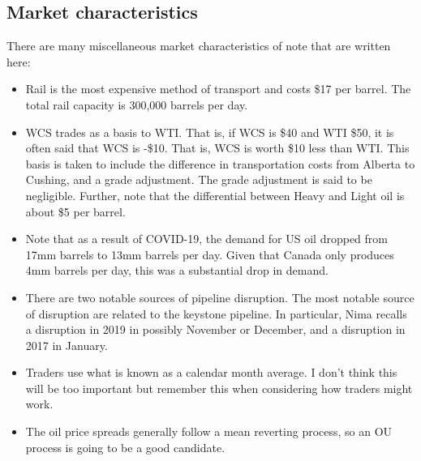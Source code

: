 \documentclass[11pt, letterpaper,nounbold]{article}
\begin{document}
\subsection{Market characteristics}
There are many miscellaneous market characteristics of note that are written here:
\begin{itemize}
	\item{Rail is the most expensive method of transport and costs \$17 per barrel. The total rail capacity is 300,000 barrels per day.}
	\item{WCS trades as a basis to WTI. That is, if WCS is \$40 and WTI \$50, it is often said that WCS is -\$10. That is, WCS is worth \$10 less than WTI. This basis is taken to include the difference in transportation costs from Alberta to Cushing, and a grade adjustment. The grade adjustment is said to be negligible. Further, note that the differential between Heavy and Light oil is about \$5 per barrel.}
	\item{Note that as a result of COVID-19, the demand for US oil dropped from 17mm barrels to 13mm barrels per day. Given that Canada only produces 4mm barrels per day, this was a substantial drop in demand.}
	\item{There are two notable sources of pipeline disruption. The most notable source of disruption are related to the keystone pipeline. In particular, Nima recalls a disruption in 2019 in possibly November or December, and a disruption in 2017 in January.}
	\item{Traders use what is known as a calendar month average. I don't think this will be too important but remember this when considering how traders might work.}
	\item{The oil price spreads generally follow a mean reverting process, so an OU process is going to be a good candidate.}
\end{itemize}
\end{document}
